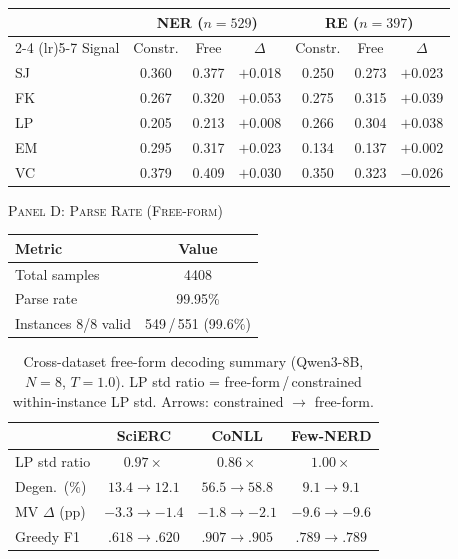\begin{table}[t]
\begin{tabular}{l ccc ccc}
\toprule
 & \multicolumn{3}{c}{NER ($n{=}529$)} & \multicolumn{3}{c}{RE ($n{=}397$)} \\
\cmidrule(lr){2-4} \cmidrule(lr){5-7}
Signal & Constr. & Free & $\Delta$ & Constr. & Free & $\Delta$ \\
\midrule
SJ & 0.360 & 0.377 & $+$0.018 & 0.250 & 0.273 & $+$0.023 \\
FK & 0.267 & 0.320 & $+$0.053 & 0.275 & 0.315 & $+$0.039 \\
LP & 0.205 & 0.213 & $+$0.008 & 0.266 & 0.304 & $+$0.038 \\
EM & 0.295 & 0.317 & $+$0.023 & 0.134 & 0.137 & $+$0.002 \\
VC & 0.379 & 0.409 & $+$0.030 & 0.350 & 0.323 & $-$0.026 \\
\bottomrule
\end{tabular}

\vspace{8pt}

{\small\textsc{Panel D: Parse Rate (Free-form)}}
\vspace{2pt}

\begin{tabular}{lc}
\toprule
Metric & Value \\
\midrule
Total samples          & 4408 \\
Parse rate             & 99.95\% \\
Instances 8/8 valid    & 549\,/\,551 (99.6\%) \\
\bottomrule
\end{tabular}

\end{table}

\begin{table}[t]
\centering
\small
\caption{Cross-dataset free-form decoding summary (Qwen3-8B, $N{=}8$, $T{=}1.0$). LP std ratio = free-form\,/\,constrained within-instance LP std. Arrows: constrained $\to$ free-form.}
\label{tab:freeform_summary}
\begin{tabular}{@{}lccc@{}}
\toprule
 & SciERC & CoNLL & Few-NERD \\
\midrule
LP std ratio & $0.97{\times}$ & $0.86{\times}$ & $1.00{\times}$ \\
Degen.\ (\%) & $13.4 {\to} 12.1$ & $56.5 {\to} 58.8$ & $9.1 {\to} 9.1$ \\
MV $\Delta$ (pp) & ${-}3.3 {\to} {-}1.4$ & ${-}1.8 {\to} {-}2.1$ & ${-}9.6 {\to} {-}9.6$ \\
Greedy F1 & $.618 {\to} .620$ & $.907 {\to} .905$ & $.789 {\to} .789$ \\
\bottomrule
\end{tabular}
\end{table}

